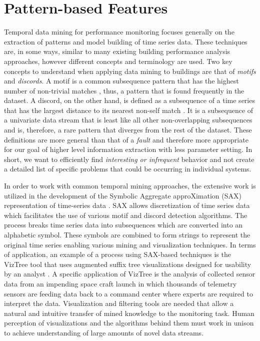 \section{Pattern-based Features}
\label{sec:weatherfeatures}

Temporal data mining for performance monitoring focuses generally on the extraction of patterns and model building of time series data. These techniques are, in some ways, similar to many existing building performance analysis approaches, however different concepts and terminology are used. Two key concepts to understand when applying data mining to buildings are that of \emph{motifs} and \emph{discords}. A motif is a common subsequence pattern that has the highest number of non-trivial matches \cite{Patel:2002bb}, thus, a pattern that is found frequently in the dataset. A discord, on the other hand, is defined as a subsequence of a time series that has the largest distance to its nearest non-self match \cite{Keogh:2005wd}. It is a subsequence of a univariate data stream that is least like all other non-overlapping subsequences and is, therefore, a rare pattern that diverges from the rest of the dataset. These definitions are more general than that of a \emph{fault} and therefore more appropriate for our goal of higher level information extraction with less parameter setting. In short, we want to efficiently find \emph{interesting or infrequent} behavior and not create a detailed list of specific problems that could be occurring in individual systems.

In order to work with common temporal mining approaches, the extensive work is utilized in the development of the Symbolic Aggregate approXimation (SAX) representation of time-series data \cite{Lin:2003wz}. SAX allows discretization of time series data which facilitates the use of various motif and discord detection algorithms. The process breaks time series data into subsequences which are converted into an alphabetic symbol. These symbols are combined to form strings to represent the original time series enabling various mining and visualization techniques. In terms of application, an example of a process using SAX-based techniques is the VizTree tool that uses augmented suffix tree visualizations designed for usability by an analyst \cite{Lin:2004wv,Lin:2005bi}. A specific application of VizTree is the analysis of collected sensor data from an impending space craft launch in which thousands of telemetry sensors are feeding data back to a command center where experts are required to interpret the data. Visualization and filtering tools are needed that allow a natural and intuitive transfer of mined knowledge to the monitoring task. Human perception of visualizations and the algorithms behind them must work in unison to achieve understanding of large amounts of novel data streams. 


